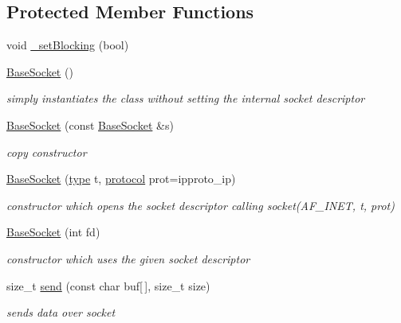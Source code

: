 \subsection*{Protected Member Functions}
\begin{CompactItemize}
\item 
void \hyperlink{classsocketpp_1_1BaseSocket_4d49273453cf67218a89065bba9088c4}{\_\-setBlocking} (bool)
\item 
\hyperlink{classsocketpp_1_1BaseSocket_3eb81ecbf94ce83afa6b2f60206c77f2}{BaseSocket} ()
\begin{CompactList}\small\item\em simply instantiates the class without setting the internal socket descriptor \item\end{CompactList}\item 
\hyperlink{classsocketpp_1_1BaseSocket_0c142db99422572579c91f3e176035c6}{BaseSocket} (const \hyperlink{classsocketpp_1_1BaseSocket}{BaseSocket} \&s)
\begin{CompactList}\small\item\em copy constructor \item\end{CompactList}\item 
\hyperlink{classsocketpp_1_1BaseSocket_35c982d7aef2041c100439cf38aa7f4d}{BaseSocket} (\hyperlink{namespacesocketpp_635f4c3b3f85aba331587404d59ae52d}{type} t, \hyperlink{namespacesocketpp_2969678def1c6c8cb4102802ca82e2cf}{protocol} prot=ipproto\_\-ip)
\begin{CompactList}\small\item\em constructor which opens the socket descriptor calling socket(AF\_\-INET, t, prot) \item\end{CompactList}\item 
\hyperlink{classsocketpp_1_1BaseSocket_f7e18d6700868abb2b476e797506eafb}{BaseSocket} (int fd)
\begin{CompactList}\small\item\em constructor which uses the given socket descriptor \item\end{CompactList}\item 
size\_\-t \hyperlink{classsocketpp_1_1BaseSocket_bf4e15b88271e34e606b9b2a5b384b5b}{send} (const char buf\mbox{[}$\,$\mbox{]}, size\_\-t size)
\begin{CompactList}\small\item\em sends data over socket \item\end{CompactList}\item 

\end{CompactItemize}

